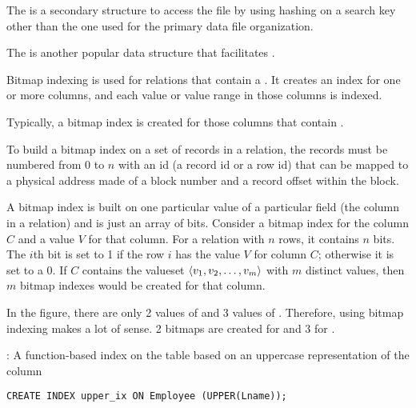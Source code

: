 

    \par The  is a secondary structure to access the file by using hashing on a search key other than the one used for the primary data file organization.

    \par The  is another popular data structure that facilitates .
    \par Bitmap indexing is used for relations that contain a . It creates an index for one or more columns, and each value or value range in those columns is indexed.
    \par Typically, a bitmap index is created for those columns that contain .
    \par To build a bitmap index on a set of records in a relation, the records must be numbered from 0 to $n$ with an id (a record id or a row id) that can be mapped to a physical address made of a block
number and a record offset within the block.
    \par A bitmap index is built on one particular value of a particular field (the column in a relation) and is just an array of bits. Consider a bitmap index for the column $C$ and a value $V$ for that column. For a relation with $n$ rows, it contains $n$ bits. The $i$th bit is set to 1 if the row $i$ has the value $V$ for column $C$; otherwise it is set to a 0. If $C$ contains the valueset $\langle v_1, v_2, \ldots, v_m \rangle$ with $m$ distinct values, then $m$ bitmap indexes would be created for that column.
    \par In the figure, there are only 2 values of  and 3 values of . Therefore, using bitmap indexing makes a lot of sense. 2 bitmaps are created for  and 3 for .

    \par {}: A function-based index on the  table based on an uppercase representation of the  column

\begin{verbatim}
CREATE INDEX upper_ix ON Employee (UPPER(Lname));
\end{verbatim}
    
